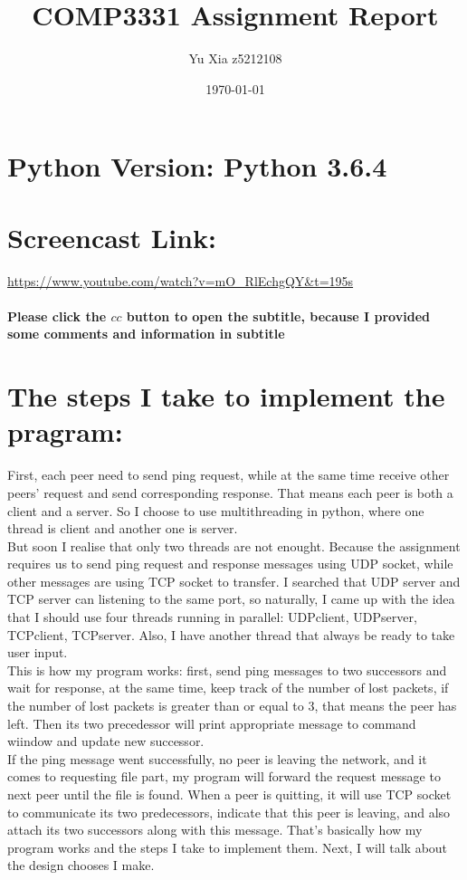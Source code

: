 \documentclass{article}
\title{COMP3331 Assignment Report}
\date{\today}
\author{Yu Xia z5212108}
\begin{document}
  \maketitle
  \section*{Python Version: Python 3.6.4}
  \section*{Screencast Link:} \url{https://www.youtube.com/watch?v=mO_RlEchgQY&t=195s} 
  \paragraph{Please click the $cc$ button to open the subtitle, because I provided some comments and information in subtitle}
  
  \section*{The steps I take to implement the pragram:}
  First, each peer need to send ping request, while at the same time receive other peers' request and send corresponding response. That means each peer is both a client and a server. So I choose to use multithreading in python, where one thread is client and another one is server. \\
  \newline
  But soon I realise that only two threads are not enought. Because the assignment requires us to send ping request and response messages using UDP socket, while other messages are using TCP socket to transfer. I searched that UDP server and TCP server can listening to the same port, so naturally, I came up with the idea that I should use four threads running in parallel: UDPclient, UDPserver, TCPclient, TCPserver. Also, I have another thread that always be ready to take user input.\\
  \newline
  This is how my program works: first, send ping messages to two successors and wait for response, at the same time, keep track of the number of lost packets, if the number of lost packets is greater than or equal to 3, that means the peer has left. Then its two precedessor will print appropriate message to command wiindow and update new successor. \\
  \newline
  If the ping message went successfully, no peer is leaving the network, and it comes to requesting file part, my program will forward the request message to next peer until the file is found. When a peer is quitting, it will use TCP socket to communicate its two predecessors, indicate that this peer is leaving, and also attach its two successors along with this message. That's basically how my program works and the steps I take to implement them. Next, I will talk about the design chooses I make.
  
\end{document}
